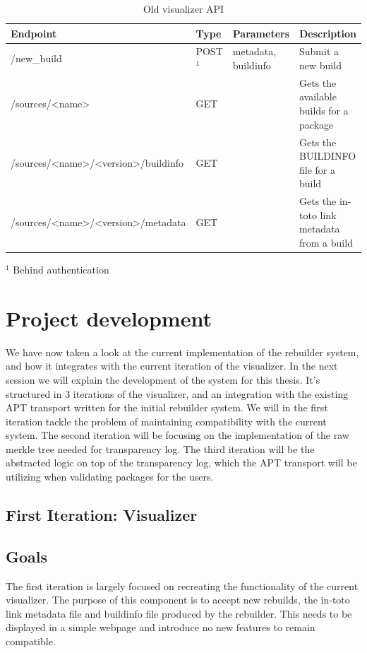 \documentclass[../Main/thesis.tex]{subfiles}
\begin{document}
\begin{table}[H]
\footnotesize
\centering
\settowidth{}
\setlength\extrarowheight{2pt}
\begin{tabulary}{\textwidth}{|l|L|l|L|}
\hline
    \textbf{Endpoint} & 
    \textbf{Type} & 
    \textbf{Parameters} & 
    \textbf{Description} \\
\hline
    /new\_build & POST$^1$ & metadata, buildinfo & Submit a new build \\  \hline
    /sources/<name> & GET & & Gets the available builds for a package \\  \hline
    /sources/<name>/<version>/buildinfo& GET & & Gets the BUILDINFO file for a build \\  \hline
    /sources/<name>/<version>/metadata & GET & & Gets the in-toto link metadata from a build \\  \hline
\end{tabulary}
\footnotesize{$^1$ Behind authentication}\\
\caption{Old visualizer API}
\label{api:old_visualizer}
\end{table}


\section{Project development}%
\label{sec:project_development}
We have now taken a look at the current implementation of the rebuilder system,
and how it integrates with the current iteration of the visualizer. In the next
session we will explain the development of the system for this thesis. It's
structured in 3 iterations of the visualizer, and an integration with the
existing APT transport written for the initial rebuilder system. We will in the
first iteration tackle the problem of maintaining compatibility with the current
system. The second iteration will be focusing on the implementation of the raw
merkle tree needed for transparency log. The third iteration will be the
abstracted logic on top of the transparency log, which the APT transport will be
utilizing when validating packages for the users.

\subsection{First Iteration: Visualizer}%
\label{sec:visualizer}

\subsection*{Goals}%
\label{sub:first_iteration_goals}
The first iteration is largely focused on recreating the functionality of the
current visualizer. The purpose of this component is to accept new rebuilds, the
in-toto link metadata file and buildinfo file produced by the rebuilder. This
needs to be displayed in a simple webpage and introduce no new features to
remain compatible.
\end{document}
